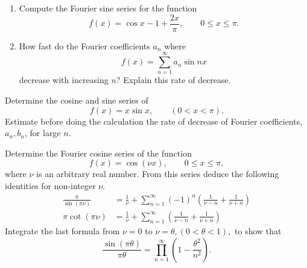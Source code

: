 {%
\begin{Exercise}
  \begin{enumerate}
  \item 
    Compute the Fourier sine series for the function
    \[
    f(x) = \cos x - 1  + \frac{2x}{\pi} ,\qquad 0 \leq x \leq \pi.
    \]
  \item 
    How fast do the Fourier coefficients $a_n$ where
    \[
    f(x) = \sum_{n = 1}^\infty a_n \sin n x
    \]
    decrease with increasing $n$? Explain this rate of decrease.
  \end{enumerate}
\end{Exercise}







\begin{Exercise}
  Determine the cosine and sine series of 
  \[
  f(x) = x \sin x,\qquad (0 < x < \pi).
  \]
  Estimate before doing the calculation the rate of decrease of Fourier
  coefficients, $a_n, b_n$, for large $n$.
\end{Exercise}







\begin{Exercise}
  Determine the Fourier cosine series of the function 
  \[
  f(x) = \cos(\nu x), \qquad 0 \leq x \leq \pi,
  \]
  where $\nu$ is an arbitrary real number. From this series deduce 
  the following identities for non-integer $\nu$.
  \begin{align*}
    \frac{\pi}{\sin(\pi \nu)} &= \frac{1}{\nu} 
    + \sum_{n = 1}^\infty (-1)^n \left( \frac{1}{\nu - n} + \frac{1}{\nu + n} \right) 
    \\
    \pi \cot(\pi \nu) &= \frac{1}{\nu}  
    + \sum_{n = 1}^\infty \left( \frac{1}{\nu - n} + \frac{1}{\nu + n} \right)
  \end{align*}
  Integrate the last formula from
  $\nu = 0$ to $\nu = \theta, (0 < \theta < 1),$ to show that
  \[
  \frac{\sin(\pi \theta)}{\pi \theta} = \prod_{n=1}^\infty \left( 1 - \frac{\theta^2}{n^2} \right).
  \]
\end{Exercise}







}
